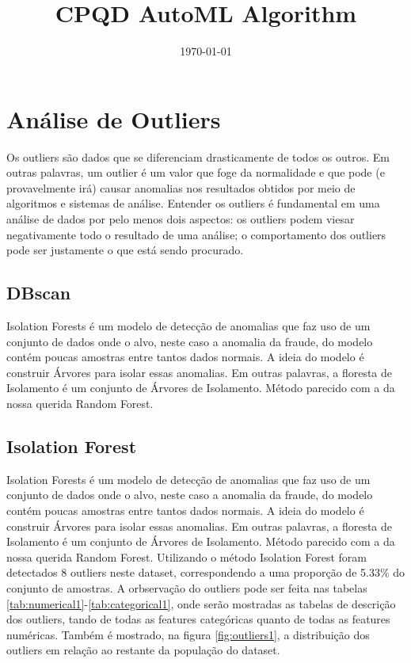 \documentclass{article}%
\title{CPQD AutoML Algorithm}%
\date{\today}%
\begin{document}
%
\normalsize%
\maketitle%
\clearpage%
\tableofcontents%
\listoffigures%
\listoftables%
\clearpage%
\section{Análise de Outliers}%
\label{sec:AnlisedeOutliers}%
Os outliers são dados que se diferenciam drasticamente de todos os outros. Em outras palavras, um outlier é um valor que foge da normalidade e que pode (e provavelmente irá) causar anomalias nos resultados obtidos por meio de algoritmos e sistemas de análise. Entender os outliers é fundamental em uma análise de dados por pelo menos dois aspectos: os outliers podem viesar negativamente todo o resultado de uma análise; o comportamento dos outliers pode ser justamente o que está sendo procurado.%
\newline%
\subsection{DBscan}%
\label{subsec:DBscan}%
Isolation Forests é um modelo de detecção de anomalias que faz uso de um conjunto de dados onde o alvo, neste caso a anomalia da fraude, do modelo contém poucas amostras entre tantos dados normais. A ideia do modelo é construir Árvores para isolar essas anomalias. Em outras palavras, a floresta de Isolamento é um conjunto de Árvores de Isolamento. Método parecido com a da nossa querida Random Forest.%
\newline

%
\subsection{Isolation Forest}%
\label{subsec:IsolationForest}%
Isolation Forests é um modelo de detecção de anomalias que faz uso de um conjunto de dados onde o alvo, neste caso a anomalia da fraude, do modelo contém poucas amostras entre tantos dados normais. A ideia do modelo é construir Árvores para isolar essas anomalias. Em outras palavras, a floresta de Isolamento é um conjunto de Árvores de Isolamento. Método parecido com a da nossa querida Random Forest.%
\newline%
Utilizando o método Isolation Forest foram detectados 8 outliers neste dataset, correspondendo a uma proporção de 5.33\% do conjunto de amostras.%
\newline%
A orbservação do outliers pode ser feita nas tabelas \ref{tab:numerical1}-\ref{tab:categorical1}, onde serão mostradas as tabelas de descrição dos outliers, tando de todas as features categóricas quanto de todas as features numéricas. Também é mostrado, na figura \ref{fig:outliers1}, a distribuição dos outliers em relação ao restante da população do dataset.%
\newline%
\end{document}
